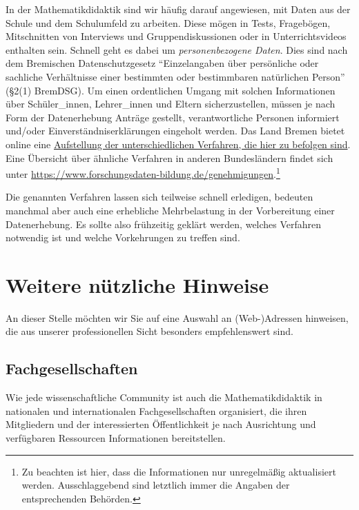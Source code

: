 \documentclass[ngerman,bibliography=totoc,oneside,12pt,a4paper]{scrbook}
\begin{document}
In der Mathematikdidaktik sind wir häufig darauf angewiesen, mit Daten
aus der Schule und dem Schulumfeld zu arbeiten. Diese mögen in Tests,
Fragebögen, Mitschnitten von Interviews und Gruppendiskussionen oder in
Unterrichtsvideos enthalten sein. Schnell geht es dabei um
\emph{personenbezogene Daten}. Dies sind nach dem Bremischen
Datenschutzgesetz \enquote{Einzelangaben über persönliche oder sachliche
Verhältnisse einer bestimmten oder bestimmbaren natürlichen Person}
(§2(1) BremDSG). Um einen ordentlichen Umgang mit solchen Informationen
über Schüler\_innen, Lehrer\_innen und Eltern sicherzustellen, müssen je
nach Form der Datenerhebung Anträge gestellt, verantwortliche Personen
informiert und/oder Einverständniserklärungen eingeholt werden. Das Land
Bremen bietet online eine
\href{https://www.bildung.bremen.de/sixcms/detail.php?gsid=bremen117.c.5312.de}{Aufstellung
der unterschiedlichen Verfahren, die hier zu befolgen sind}. Eine
Übersicht über ähnliche Verfahren in anderen Bundesländern findet sich
unter
\url{https://www.forschungsdaten-bildung.de/genehmigungen}.\footnote{Zu
  beachten ist hier, dass die Informationen nur unregelmäßig
  aktualisiert werden. Ausschlaggebend sind letztlich immer die Angaben
  der entsprechenden Behörden.}

Die genannten Verfahren lassen sich teilweise schnell erledigen,
bedeuten manchmal aber auch eine erhebliche Mehrbelastung in der
Vorbereitung einer Datenerhebung. Es sollte also frühzeitig geklärt
werden, welches Verfahren notwendig ist und welche Vorkehrungen zu
treffen sind.

\chapter{Weitere nützliche Hinweise}\label{weitere-nutzliche-hinweise}

An dieser Stelle möchten wir Sie auf eine Auswahl an (Web-)Adressen
hinweisen, die aus unserer professionellen Sicht besonders
empfehlenswert sind.

\section{Fachgesellschaften}\label{fachgesellschaften}

Wie jede wissenschaftliche Community ist auch die Mathematikdidaktik in
nationalen und internationalen Fachgesellschaften organisiert, die ihren
Mitgliedern und der interessierten Öffentlichkeit je nach Ausrichtung
und verfügbaren Ressourcen Informationen bereitstellen.
\end{document}
